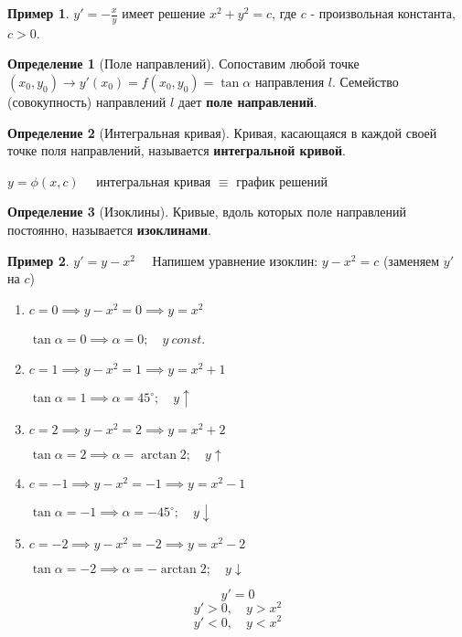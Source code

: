 \documentclass{report}
\theoremstyle{definition}
\newtheorem{definition}{Определение}[section]
\newtheorem{example}{Пример}
\begin{document}
\begin{example}
    $y' = - \frac{x}{y}$ имеет решение $x^2 + y^2 = c$, где $c$ - произвольная константа, $c > 0$.
\end{example}

\begin{definition}[Поле направлений]
    Сопоставим любой точке $(x_0,y_0) \rightarrow y'(x_0) = f(x_0,y_0) = \tan\alpha$ направления $l$. Семейство (совокупность) направлений $l$ дает \textbf{поле направлений}.
\end{definition}

\begin{definition}[Интегральная кривая]
    Кривая, касающаяся в каждой своей точке поля направлений, называется \textbf{интегральной кривой}.
    \begin{center}
        $y=\phi(x,c) \quad$ интегральная кривая $\equiv$ график решений
    \end{center}
\end{definition}

\begin{definition}[Изоклины]
    Кривые, вдоль которых поле направлений постоянно, называется \textbf{изоклинами}.
\end{definition}

\begin{example}
    $y' = y-x^2 \quad$ Напишем уравнение изоклин: $y-x^2 = c$ (заменяем $y'$ на $c$)
    \begin{enumerate}
        \item $c=0 \implies y-x^2 = 0 \implies y=x^2$

              $\tan \alpha = 0 \implies \alpha = 0; \quad y \ const$.
        \item $c=1 \implies y-x^2 = 1 \implies y=x^2 + 1$

              $\tan \alpha = 1 \implies \alpha = 45^{\circ}; \quad y\uparrow$
        \item $c=2 \implies y-x^2 = 2 \implies y=x^2 + 2$

              $\tan \alpha = 2 \implies \alpha = \arctan 2; \quad y\uparrow$
        \item $c=-1 \implies y-x^2 = -1 \implies y=x^2 - 1$

              $\tan \alpha = -1 \implies \alpha = -45^{\circ}; \quad y\downarrow$
        \item $c=-2 \implies y-x^2 = -2 \implies y=x^2 - 2$

              $\tan \alpha = -2 \implies \alpha = -\arctan 2; \quad y\downarrow$
    \end{enumerate}
    \begin{equation*}
        y' = 0
    \end{equation*}
    \begin{equation*}
        y' > 0, \quad y > x^2
    \end{equation*}
    \begin{equation*}
        y' < 0, \quad y < x^2
    \end{equation*}
\end{example}
\end{document}
